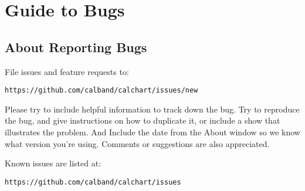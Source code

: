 \chapter{Guide to Bugs}\label{bugs}

\section{About Reporting Bugs}\label{reportingbugs}

File issues and feature requests to:

\begin{verbatim}
https://github.com/calband/calchart/issues/new
\end{verbatim}


Please try to include
helpful information to track down the bug.  Try to reproduce the bug,
and give instructions on how to duplicate it, or include a show that
illustrates the problem.  And Include the date from the About window so we
know what version you're using.  Comments or suggestions are also
appreciated.

Known issues are listed at:

\begin{verbatim}
https://github.com/calband/calchart/issues
\end{verbatim}

